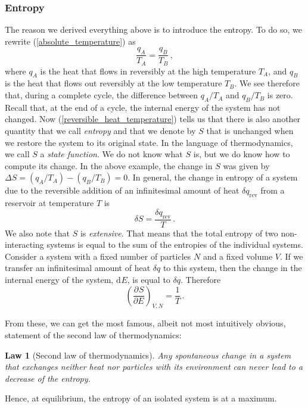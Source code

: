 \documentclass{article}
\theoremstyle{plain}\theoremheaderfont{\normalfont\bfseries}\theorembodyfont{\rmfamily}\theoremseparator{.}\newtheorem*{thm}{Theorem}\newtheorem*{law}{Law}\newtheorem*{pos}{Postulate}
\numberwithin{equation}{section}
\renewcommand{\d}[2][]{\mathrm{d}^{#1} #2}
\newcommand{\pdv}[3][]{\frac{\partial^{#1} #2}{{\partial #3}^{#1}}}
\begin{document}
    \subsubsection{Entropy}
    The reason we derived everything above is to introduce the entropy. To do so, we rewrite (\ref{absolute_temperature}) as
    \begin{equation}\label{reversible_heat_temperature}
        \frac{q_A}{T_A}=\frac{q_B}{T_B}\,,
    \end{equation}
    where \(q_A\) is the heat that flows in reversibly at the high temperature \(T_A\), and \(q_B\) is the heat that flows out reversibly at the low temperature \(T_B\). We see therefore that, during a complete cycle, the difference between \(q_A/T_A\) and \(q_B/T_B\) is zero. Recall that, at the end of a cycle, the internal energy of the system has not changed. Now (\ref{reversible_heat_temperature}) tells us that there is also another quantity that we call \textit{entropy} and that we denote by \(S\) that is unchanged when we restore the system to its original state. In the language of thermodynamics, we call \(S\) a \textit{state function}. We do not know what \(S\) is, but we do know how to compute its change. In the above example, the change in \(S\) was given by \(\Delta S=(q_A/T_A)-(q_B/T_B)=0\). In general, the change in entropy of a system due to the reversible addition of an infinitesimal amount of heat \(\delta q_{\text{rev}}\) from a reservoir at temperature \(T\) is
    \begin{equation}\label{entropy}
        \delta S=\frac{\delta q_{\text{rev}}}{T}\,.
    \end{equation}
    We also note that \(S\) is \textit{extensive}. That means that the total entropy of two non-interacting systems is equal to the sum of the entropies of the individual systems. Consider a system with a fixed number of particles \(N\) and a fixed volume \(V\). If we transfer an infinitesimal amount of heat \(\delta q\) to this system, then the change in the internal energy of the system, \(\d{E}\), is equal to \(\delta q\). Therefore
    \begin{equation}
        \left(\pdv{S}{E}\right)_{V,N}=\frac{1}{T}\,.
    \end{equation}

    From these, we can get the most famous, albeit not most intuitively obvious, statement of the second law of thermodynamics:
    \begin{law}[Second law of thermodynamics]
        Any spontaneous change in a system that exchanges neither heat nor particles with its environment can never lead to a decrease of the entropy.
    \end{law}
    Hence, at equilibrium, the entropy of an isolated system is at a maximum.
\end{document}
